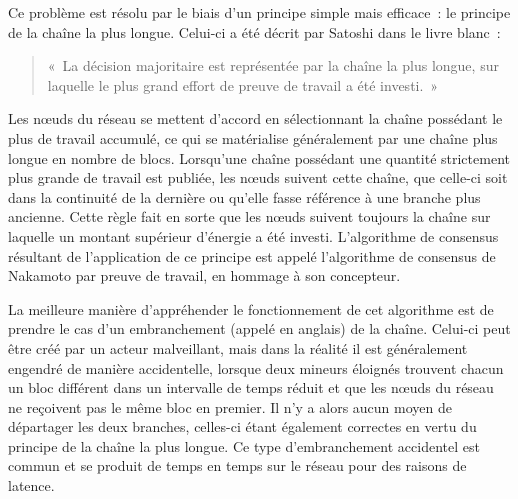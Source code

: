 
Ce problème est résolu par le biais d'un principe simple mais efficace~: le principe de la chaîne la plus longue. Celui-ci a été décrit par Satoshi dans le livre blanc~: 

\begin{quote}
«~La décision majoritaire est représentée par la chaîne la plus longue, sur laquelle le plus grand effort de preuve de travail a été investi.~»
\end{quote}

Les nœuds du réseau se mettent d'accord en sélectionnant la chaîne possédant le plus de travail accumulé, ce qui se matérialise généralement par une chaîne plus longue en nombre de blocs. Lorsqu'une chaîne possédant une quantité strictement plus grande de travail est publiée, les nœuds suivent cette chaîne, que celle-ci soit dans la continuité de la dernière ou qu'elle fasse référence à une branche plus ancienne. Cette règle fait en sorte que les nœuds suivent toujours la chaîne sur laquelle un montant supérieur d'énergie a été investi. L'algorithme de consensus résultant de l'application de ce principe est appelé l'algorithme de consensus de Nakamoto par preuve de travail, en hommage à son concepteur.


La meilleure manière d'appréhender le fonctionnement de cet algorithme est de prendre le cas d'un embranchement (appelé  en anglais) de la chaîne. Celui-ci peut être créé par un acteur malveillant, mais dans la réalité il est généralement engendré de manière accidentelle, lorsque deux mineurs éloignés trouvent chacun un bloc différent dans un intervalle de temps réduit et que les nœuds du réseau ne reçoivent pas le même bloc en premier. Il n'y a alors aucun moyen de départager les deux branches, celles-ci étant également correctes en vertu du principe de la chaîne la plus longue. Ce type d'embranchement accidentel est commun et se produit de temps en temps sur le réseau pour des raisons de latence.

